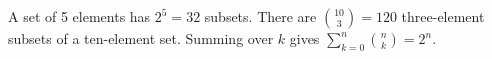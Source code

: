 A set of 5 elements has $2^{5} = 32$ subsets.
There are $\binom{10}{3} = 120$ three-element subsets of a ten-element set.
Summing over $k$ gives $\sum_{k=0}^{n} \binom{n}{k} = 2^{n}$.